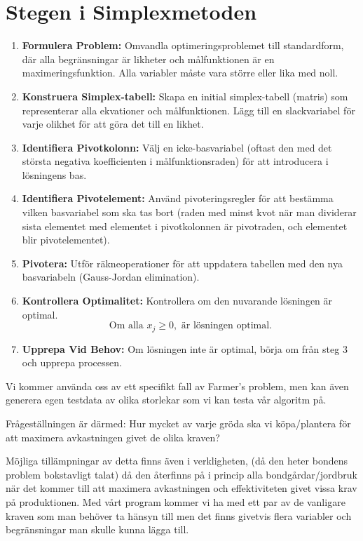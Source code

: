 \documentclass{article}
\begin{document}
\section*{Stegen i Simplexmetoden}
\begin{enumerate}
    \item \textbf{Formulera Problem:} Omvandla optimeringsproblemet till standardform, där alla begränsningar är likheter och målfunktionen är en maximeringsfunktion. Alla variabler måste vara större eller lika med noll.
    
    \item \textbf{Konstruera Simplex-tabell:} Skapa en initial simplex-tabell (matris) som representerar alla ekvationer och målfunktionen. Lägg till en slackvariabel för varje olikhet för att göra det till en likhet.
    
    \item \textbf{Identifiera Pivotkolonn:} Välj en icke-basvariabel (oftast den med det största negativa koefficienten i målfunktionsraden) för att introducera i lösningens bas.
    
    \item \textbf{Identifiera Pivotelement:} Använd pivoteringsregler för att bestämma vilken basvariabel som ska tas bort (raden med minst kvot när man dividerar sista elementet med elementet i pivotkolonnen är pivotraden, och elementet blir pivotelementet).
    
    \item \textbf{Pivotera:} Utför räkneoperationer för att uppdatera tabellen med den nya basvariabeln (Gauss-Jordan elimination).
    
    \item \textbf{Kontrollera Optimalitet:} Kontrollera om den nuvarande lösningen är optimal.
    \[
    \text{Om alla } x_j \geq 0, \text{ är lösningen optimal.}
    \]
    
    \item \textbf{Upprepa Vid Behov:} Om lösningen inte är optimal, börja om från steg 3 och upprepa processen.
\end{enumerate}

Vi kommer använda oss av ett specifikt fall av Farmer’s problem, men kan även generera egen testdata av olika storlekar som vi kan testa vår algoritm på. 

Frågeställningen är därmed: Hur mycket av varje gröda ska vi köpa/plantera för att maximera avkastningen givet de olika kraven?

Möjliga tillämpningar av detta finns även i verkligheten, (då den heter bondens problem bokstavligt talat) då den återfinns på i princip alla bondgårdar/jordbruk när det kommer till att maximera avkastningen och effektiviteten givet vissa krav på produktionen. Med vårt program kommer vi ha med ett par av de vanligare kraven som man behöver ta hänsyn till men det finns givetvis flera variabler och begränsningar man skulle kunna lägga till. 
\end{document}
